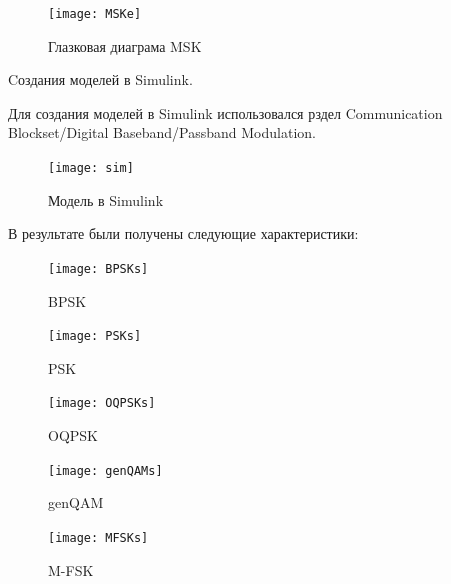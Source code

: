\documentclass[10pt,a4paper]{article}
\begin{document}
\begin{figure}[h]\centering
	\texttt{[image: MSKe]}
	\caption{Глазковая диаграма MSK}\label{fig.MSKe}
\end{figure}                                                                                                                                                                                                                                                                                                                                                                                                                                                                                                                                                                                                                                                                                                                                                                                                                                                                                                                                                                                                                                                                                                                                                                                                                                                                                                                                                                                                                                                                        
\FloatBarrier

Cоздания моделей в Simulink.

Для создания моделей в Simulink использовался рздел Communication Blockset/Digital Baseband/Passband Modulation.
\begin{figure}[h]\centering
	\texttt{[image: sim]}
	\caption{Модель в Simulink}\label{fig.sim}
\end{figure}

В результате были получены следующие характеристики:

\begin{figure}[h]\centering
	\texttt{[image: BPSKs]}
	\caption{BPSK}\label{fig.BPSKs}
\end{figure}
\begin{figure}[h]\centering
	\texttt{[image: PSKs]}
	\caption{PSK}\label{fig.PSKs}
\end{figure}
\begin{figure}[h]\centering
	\texttt{[image: OQPSKs]}
	\caption{OQPSK}\label{fig.OQPSKs}
\end{figure}
\begin{figure}[h]\centering
	\texttt{[image: genQAMs]}
	\caption{genQAM}\label{fig.genQAMs}
\end{figure}
\begin{figure}[h]\centering
	\texttt{[image: MFSKs]}
	\caption{M-FSK}\label{fig.MFSKs}
\end{figure}
\end{document}
